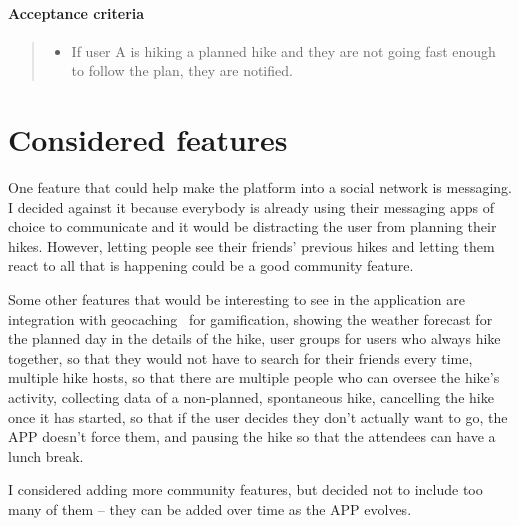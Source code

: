 \paragraph*{Acceptance criteria}
\begin{quote}
\begin{itemize}
    \item If user A is hiking a planned hike and they are not going fast enough to follow the plan, they are notified.
\end{itemize}
\end{quote}


\section{Considered features}
One feature that could help make the platform into a social network is messaging.
I decided against it because everybody is already using their messaging apps of choice to communicate and it would be distracting the user from planning their hikes.
However, letting people see their friends' previous hikes and letting them react to all that is happening could be a good community feature.

Some other features that would be interesting to see in the application are integration with geocaching~\cite{geocaching} for gamification,
showing the weather forecast for the planned day in the details of the hike,
user groups for users who always hike together, so that they would not have to search for their friends every time,
multiple hike hosts, so that there are multiple people who can oversee the hike's activity,
collecting data of a non-planned, spontaneous hike,
cancelling the hike once it has started, so that if the user decides they don't actually want to go, the APP doesn't force them,
and pausing the hike so that the attendees can have a lunch break.

I considered adding more community features, but decided not to include too many of them -- they can be added over time as the APP evolves.
